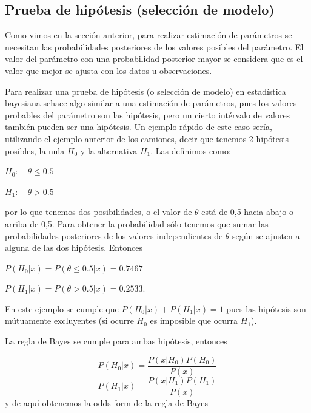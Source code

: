 \documentclass{article}
\begin{document}
\subsection*{Prueba de hip\'otesis (selecci\'on de modelo)}

Como vimos en la secci\'on anterior, para realizar estimaci\'on de par\'ametros se necesitan las probabilidades posteriores de los valores posibles del par\'ametro. El valor del par\'ametro con una probabilidad posterior mayor se considera que es el valor que mejor se ajusta con los datos u observaciones.

Para realizar una prueba de hip\'otesis (o selecci\'on de modelo) en estad\'istica bayesiana sehace algo similar a una estimaci\'on de par\'ametros, pues los valores probables del par\'ametro son las hip\'otesis, pero un cierto int\'ervalo de valores tambi\'en pueden ser una hip\'otesis. 
Un ejemplo r\'apido de este caso ser\'ia, utilizando el ejemplo anterior de los camiones, decir que tenemos 2 hip\'otesis posibles, la nula $H_0$  y la alternativa $H_1$. Las definimos como:

\begin{center}
$H_0: \quad \theta \leq 0.5$

$H_1: \quad \theta > 0.5$
\end{center}
por lo que tenemos dos posibilidades, o el valor de $\theta$ est\'a de 0,5 hacia abajo o arriba de 0,5. Para obtener la probabilidad s\'olo tenemos que sumar las probabilidades posteriores de los valores independientes de $\theta$ seg\'un se ajusten a alguna de las dos hip\'otesis. Entonces

\begin{center}
$P(H_0\vert x)= P(\theta \leq 0.5 \vert x)=0.7467$

$P(H_1\vert x)= P(\theta > 0.5 \vert x)=0.2533$.
\end{center}
En este ejemplo se cumple que $P(H_0\vert x)+P(H_1\vert x)=1$ pues las hip\'otesis son m\'utuamente excluyentes (si ocurre $H_0$ es imposible que ocurra $H_1$). 


La regla de Bayes se cumple para ambas hip\'otesis, entonces

\begin{equation}
P(H_0\vert x)=\frac{P(x\vert H_0)P(H_0)}{P(x)}
\end{equation}
\begin{equation}
P(H_1\vert x)=\frac{P(x\vert H_1)P(H_1)}{P(x)}
\end{equation}
y de aqu\'i obtenemos la odds form de la regla de Bayes
\end{document}
